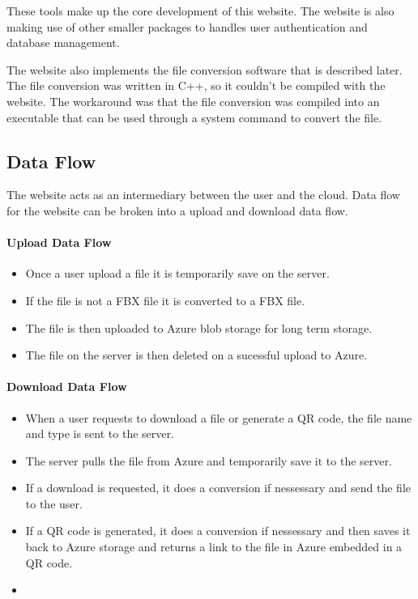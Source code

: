     These tools make up the core development of this website. The website is also
    making use of other smaller packages to handles user authentication and database management.

    The website also implements the file conversion software that is described later.
    The file conversion was written in C++, so it couldn't be compiled with the website.
    The workaround was that the file conversion was compiled into an executable that can be used through a system command to convert the file.


    \subsection{Data Flow}
    The website acts as an intermediary between the user and the cloud. Data flow for the website can be broken into a upload and download data flow.

    \paragraph{Upload Data Flow}
    \begin{itemize}
        \item Once a user upload a file it is temporarily save on the server.
        \item If the file is not a FBX file it is converted to a FBX file.
        \item The file is then uploaded to Azure blob storage for long term storage.
        \item The file on the server is then deleted on a sucessful upload to Azure.
    \end{itemize}

    \paragraph{Download Data Flow}
    \begin{itemize}
        \item When a user requests to download a file or generate a QR code, the file name and type is sent to the server.
        \item The server pulls the file from Azure and temporarily save it to the server.
        \item If a download is requested, it does a conversion if nessessary and send the file to the user.
        \item If a QR code is generated, it does a conversion if nessessary and then saves it back to Azure storage and returns a link to the file in Azure embedded in a QR code.
        \item 
    \end{itemize}


